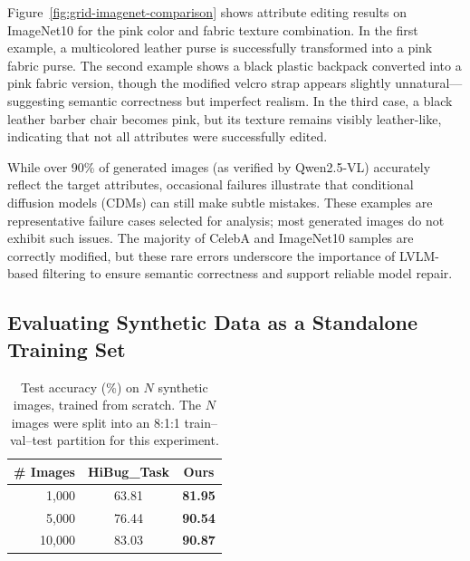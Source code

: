 \documentclass[10pt]{article} %
\newcommand{\qwen}{Qwen2.5-VL\xspace}
\begin{document}
Figure~\ref{fig:grid-imagenet-comparison} shows attribute editing results on ImageNet10 for the pink color and fabric texture combination. In the first example, a multicolored leather purse is successfully transformed into a pink fabric purse. The second example shows a black plastic backpack converted into a pink fabric version, though the modified velcro strap appears slightly unnatural—suggesting semantic correctness but imperfect realism. In the third case, a black leather barber chair becomes pink, but its texture remains visibly leather-like, indicating that not all attributes were successfully edited.

While over 90\% of generated images (as verified by \qwen) accurately reflect the target attributes, occasional failures illustrate that conditional diffusion models (CDMs) can still make subtle mistakes. These examples are representative failure cases selected for analysis; most generated images do not exhibit such issues. The majority of CelebA and ImageNet10 samples are correctly modified, but these rare errors underscore the importance of LVLM-based filtering to ensure semantic correctness and support reliable model repair. 





\subsection{Evaluating Synthetic Data as a Standalone Training Set}
\label{sec:synthetic_standalone} %

\begin{table}[h] %
\centering
\setlength{\tabcolsep}{6pt}
\renewcommand{\arraystretch}{1.1}
\small
\caption{Test accuracy (\%) on $N$ synthetic images, trained from scratch. The $N$ images were split into an 8:1:1 train--val--test partition for this experiment.}
\label{tab:valsplit_retrain} %
\begin{tabular}{rcc}
\toprule
\# Images & HiBug\_Task & \textbf{Ours} \\
\midrule
1{,}000  & 63.81 & \textbf{81.95} \\
5{,}000  & 76.44 & \textbf{90.54} \\
10{,}000 & 83.03 & \textbf{90.87} \\
\bottomrule
\end{tabular}
\vspace{-1em}
\end{table}
\end{document}
